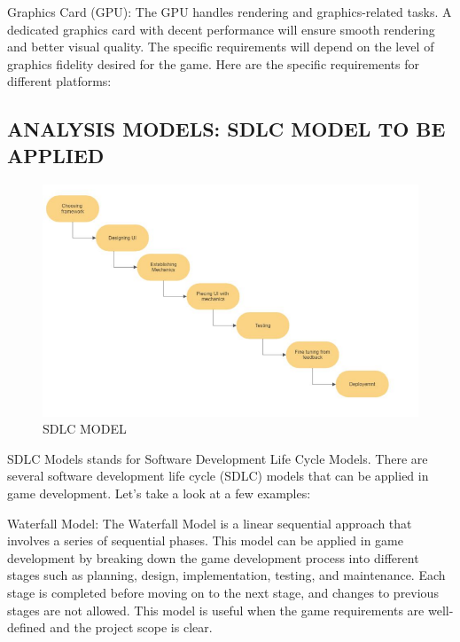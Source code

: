 \documentclass[12pt]{report}
\begin{document}
Graphics Card (GPU): The GPU handles rendering and graphics-related tasks. A dedicated graphics card with decent performance will ensure smooth rendering and better visual quality. The specific requirements will depend on the level of graphics fidelity desired for the game.
Here are the specific requirements for different platforms:



\centering
\raggedright
\subsection{  ANALYSIS MODELS: SDLC MODEL TO BE APPLIED}

\justifying
\setlength{\parindent}{4em}
\setlength{\parskip}{0.5em}
\renewcommand{\baselinestretch}{1.5}

\vspace{2cm}
\begin{figure}[h]
\centering
\includegraphics[scale=0.9]{Class Diagram.png}
\caption{SDLC MODEL}
\label{SDLC}
\end{figure}

\normalsize
SDLC Models stands for Software Development Life Cycle Models.
There are several software development life cycle (SDLC) models that can be applied in game development.
Let's take a look at a few examples:

Waterfall Model: The Waterfall Model is a linear sequential approach that involves a series of sequential phases. This model can be applied in game development by breaking down the game development process into different stages such as planning, design, implementation, testing, and maintenance. Each stage is completed before moving on to the next stage, and changes to previous stages are not allowed. This model is useful when the game requirements are well-defined and the project scope is clear.
\end{document}
